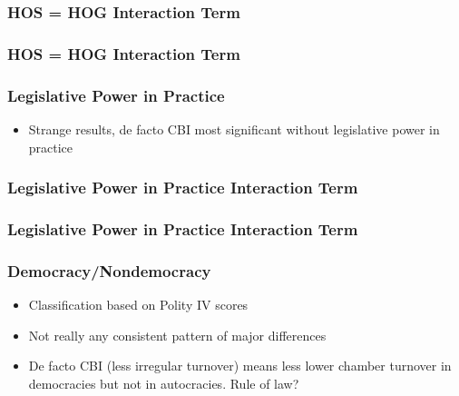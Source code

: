 \documentclass{beamer}
\begin{document}
    \begin{frame}
        \frametitle{HOS = HOG Interaction Term}
        {
            \let\oldcentering\centering
            \renewcommand\centering{\tiny\oldcentering}
            
        }
    \end{frame}

    \begin{frame}
        \frametitle{HOS = HOG Interaction Term}
        {
            \let\oldcentering\centering
            \renewcommand\centering{\tiny\oldcentering}
            
        }
    \end{frame}

    \begin{frame}
        \frametitle{Legislative Power in Practice}
        \begin{itemize}
            \item Strange results, de facto CBI most significant without legislative power in practice
        \end{itemize}
    \end{frame}

    \begin{frame}
        \frametitle{Legislative Power in Practice Interaction Term}
        {
            \let\oldcentering\centering
            \renewcommand\centering{\tiny\oldcentering}
            
        }
    \end{frame}

    \begin{frame}
        \frametitle{Legislative Power in Practice Interaction Term}
        {
            \let\oldcentering\centering
            \renewcommand\centering{\tiny\oldcentering}
            
        }
    \end{frame}

    \begin{frame}
        \frametitle{Democracy/Nondemocracy}
        \begin{itemize}
            \item Classification based on Polity IV scores
            \item Not really any consistent pattern of major differences
            \item De facto CBI (less irregular turnover) means less lower chamber turnover in democracies but not in autocracies. Rule of law?
        \end{itemize}
    \end{frame}
\end{document}
